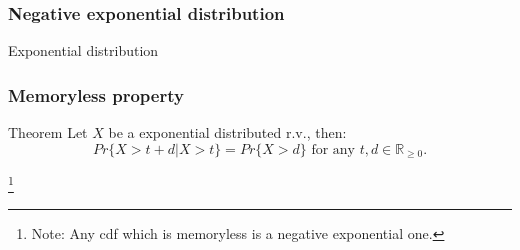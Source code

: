 \documentclass{beamer}
\begin{document}
\begin{frame}
	\frametitle{Negative exponential distribution}
	\begin{block}{Exponential distribution}
	\begin{figure}
        \centering
	\end{figure}
	\end{block}
\end{frame}

\begin{frame}
	\frametitle{Memoryless property}
	\begin{block}{Theorem}
		Let $X$ be a exponential distributed r.v., then: 
		\begin{equation*}
			Pr\{X > t + d | X > t\} = Pr\{X > d\} \text{ for any } t, d\in\mathbb{R}_{\geq 0}.
		\end{equation*}
	\end{block}
	\vspace{2ex}
	\vspace{2ex}
	\let\thefootnote\relax\footnote{Note: Any cdf which is memoryless is a negative exponential one.}
\end{frame}
\end{document}
